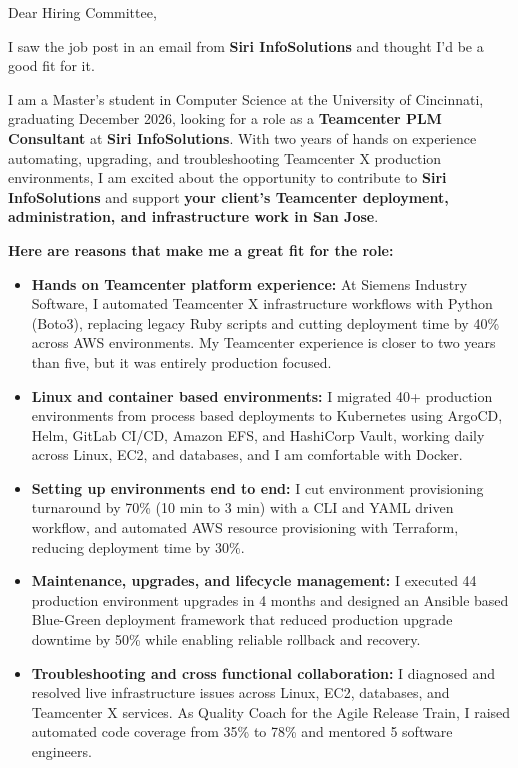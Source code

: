 \documentclass[11pt]{letter}
\date{}
\begin{document}
\begin{letter}{}

\opening{Dear Hiring Committee,}

I saw the job post in an email from \textbf{Siri InfoSolutions} and thought I'd be a good fit for it.

I am a Master's student in Computer Science at the University of Cincinnati, graduating December 2026, looking for a role as a \textbf{Teamcenter PLM Consultant} at \textbf{Siri InfoSolutions}. With two years of hands on experience automating, upgrading, and troubleshooting Teamcenter X production environments, I am excited about the opportunity to contribute to \textbf{Siri InfoSolutions} and support \textbf{your client's Teamcenter deployment, administration, and infrastructure work in San Jose}.

\textbf{Here are reasons that make me a great fit for the role:}

\begin{itemize}[leftmargin=*, itemsep=0.45em]
    \item \textbf{Hands on Teamcenter platform experience:} At Siemens Industry Software, I automated Teamcenter X infrastructure workflows with Python (Boto3), replacing legacy Ruby scripts and cutting deployment time by 40\% across AWS environments. My Teamcenter experience is closer to two years than five, but it was entirely production focused.

    \item \textbf{Linux and container based environments:} I migrated 40+ production environments from process based deployments to Kubernetes using ArgoCD, Helm, GitLab CI/CD, Amazon EFS, and HashiCorp Vault, working daily across Linux, EC2, and databases, and I am comfortable with Docker.

    \item \textbf{Setting up environments end to end:} I cut environment provisioning turnaround by 70\% (10 min to 3 min) with a CLI and YAML driven workflow, and automated AWS resource provisioning with Terraform, reducing deployment time by 30\%.

    \item \textbf{Maintenance, upgrades, and lifecycle management:} I executed 44 production environment upgrades in 4 months and designed an Ansible based Blue-Green deployment framework that reduced production upgrade downtime by 50\% while enabling reliable rollback and recovery.

    \item \textbf{Troubleshooting and cross functional collaboration:} I diagnosed and resolved live infrastructure issues across Linux, EC2, databases, and Teamcenter X services. As Quality Coach for the Agile Release Train, I raised automated code coverage from 35\% to 78\% and mentored 5 software engineers.
\end{itemize}


\end{letter}
\end{document}
